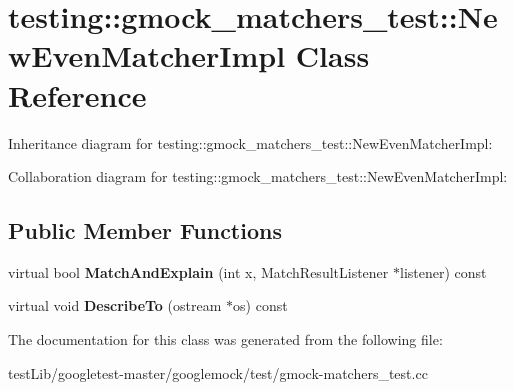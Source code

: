 \hypertarget{classtesting_1_1gmock__matchers__test_1_1NewEvenMatcherImpl}{}\section{testing\+:\+:gmock\+\_\+matchers\+\_\+test\+:\+:New\+Even\+Matcher\+Impl Class Reference}
\label{classtesting_1_1gmock__matchers__test_1_1NewEvenMatcherImpl}


Inheritance diagram for testing\+:\+:gmock\+\_\+matchers\+\_\+test\+:\+:New\+Even\+Matcher\+Impl\+:


Collaboration diagram for testing\+:\+:gmock\+\_\+matchers\+\_\+test\+:\+:New\+Even\+Matcher\+Impl\+:
\subsection*{Public Member Functions}
\begin{DoxyCompactItemize}
\item 
\mbox{\label{classtesting_1_1gmock__matchers__test_1_1NewEvenMatcherImpl_a56819af55d88569fdfaa51b937f76337}} 
virtual bool {\bfseries Match\+And\+Explain} (int x, Match\+Result\+Listener $\ast$listener) const
\item 
\mbox{\label{classtesting_1_1gmock__matchers__test_1_1NewEvenMatcherImpl_aece368c865501da4b30620d06a2690cd}} 
virtual void {\bfseries Describe\+To} (ostream $\ast$os) const
\end{DoxyCompactItemize}


The documentation for this class was generated from the following file\+:\begin{DoxyCompactItemize}
\item 
test\+Lib/googletest-\/master/googlemock/test/gmock-\/matchers\+\_\+test.\+cc\end{DoxyCompactItemize}
